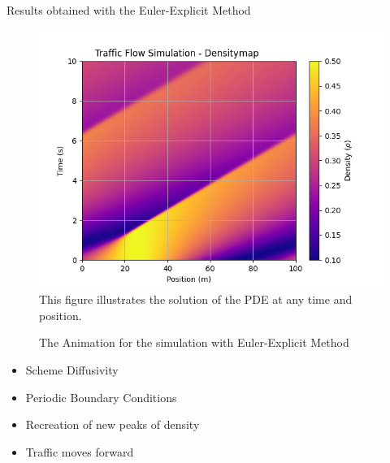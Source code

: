 \documentclass{beamer}
\begin{document}
\begin{frame}{Results obtained with the Euler-Explicit Method}
	\vspace{-0.5cm}
	\begin{minipage}[t]{0.48\linewidth}
		\begin{figure}
			\centering
			\includegraphics[width=\linewidth]{traffic_flow_density_map.png}
			\caption[Traffic Flow Simulation With Euler Explicit]{ This figure illustrates the solution of the PDE at any time and position.}
			\label{fig:traffic_flow_density_map}
		\end{figure}
	\end{minipage}
	\hfill
	\begin{minipage}[t]{0.48\linewidth}
		\begin{figure}
			\centering
			\caption{The Animation for the simulation with Euler-Explicit Method}
			\label{fig:euler_explicit_animation}
		\end{figure}
	\end{minipage}
	\vspace{-0.2cm}
	\begin{block}{}
		\begin{multicols}{2}
			\begin{itemize}
				\item Scheme Diffusivity
				\item Periodic Boundary Conditions 
				\item Recreation of new peaks of density
				\item Traffic moves forward
			\end{itemize}
		\end{multicols}
	\end{block}
\end{frame}
\end{document}
